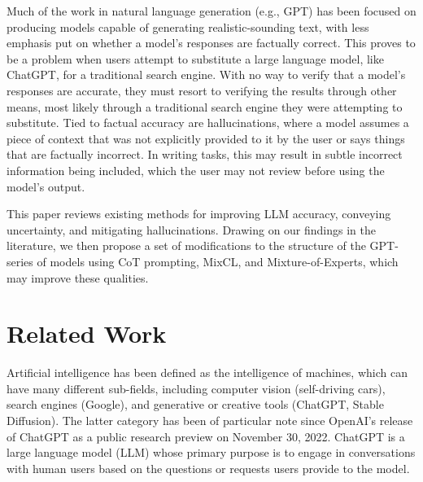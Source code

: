 \documentclass[letterpaper,12pt]{article}
\begin{document}
Much of the work in natural language generation (e.g., GPT) has been focused on producing models capable of generating realistic-sounding text, with less emphasis put on whether a model's responses are factually correct. This proves to be a problem when users attempt to substitute a large language model, like ChatGPT, for a traditional search engine. With no way to verify that a model's responses are accurate, they must resort to verifying the results through other means, most likely through a traditional search engine they were attempting to substitute. Tied to factual accuracy are hallucinations, where a model assumes a piece of context that was not explicitly provided to it by the user or says things that are factually incorrect. In writing tasks, this may result in subtle incorrect information being included, which the user may not review before using the model's output.

This paper reviews existing methods for improving LLM accuracy, conveying uncertainty, and mitigating hallucinations. Drawing on our findings in the literature, we then propose a set of modifications to the structure of the GPT-series of models using CoT prompting, MixCL, and Mixture-of-Experts, which may improve these qualities.

\section{Related Work}
Artificial intelligence has been defined as the intelligence of machines, which can have many different sub-fields, including computer vision (self-driving cars), search engines (Google), and generative or creative tools (ChatGPT, Stable Diffusion). The latter category has been of particular note since OpenAI's release of ChatGPT as a public research preview on November 30, 2022. ChatGPT is a large language model (LLM) whose primary purpose is to engage in conversations with human users based on the questions or requests users provide to the model.
\end{document}
